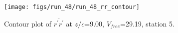 \begin{figure}[H]
\centering
\texttt{[image: figs/run\_48/run\_48\_rr\_contour]}
\caption{Contour plot of $\overline{r^\prime r^\prime}$ at $z/c$=9.00, $V_{free}$=29.19, station 5.}
\end{figure}


